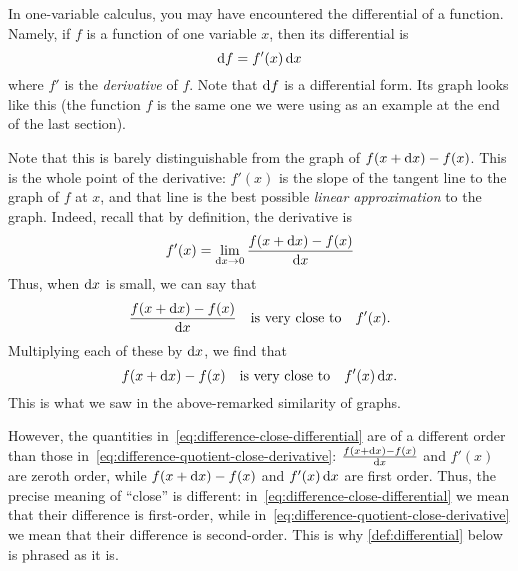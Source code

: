 \documentclass[12pt]{amsart}
\begin{document}
In one-variable calculus, you may have encountered the differential of a function.
Namely, if $f$ is a function of one variable $x$, then its differential is
\begin{equation}
  \mathrm{d} f = f'(x) \, \mathrm{d} x\label{eq:onevariable-differential}
\end{equation}
where $f'$ is the \emph{derivative} of $f$.
Note that $\mathrm{d} f$ is a differential form.
Its graph looks like this (the function $f$ is the same one we were using as an example at the end of the last section).
\begin{center}
\end{center}
Note that this is barely distinguishable from the graph of $f(x+\mathrm{d} x)-f(x)$.
This is the whole point of the derivative: $f'(x)$ is the slope of the tangent line to the graph of $f$ at $x$, and that line is the best possible \emph{linear approximation} to the graph.
Indeed, recall that by definition, the derivative is
\[ f'(x) = \lim_{\mathrm{d} x\to 0} \frac{f(x+\mathrm{d} x)-f(x)}{\mathrm{d} x} \]
Thus, when $\mathrm{d} x$ is small, we can say that
\begin{equation}\label{eq:difference-quotient-close-derivative}
  \frac{f(x+\mathrm{d} x)-f(x)}{\mathrm{d} x}\quad\text{is very close to}\quad f'(x).
\end{equation}
Multiplying each of these by $\mathrm{d} x$, we find that
\begin{equation}
  f(x+\mathrm{d} x)-f(x) \quad\text{is very close to}\quad f'(x)\,\mathrm{d} x.\label{eq:difference-close-differential}
\end{equation}
This is what we saw in the above-remarked similarity of graphs.

\begin{adv}
  However, the quantities in~\cref{eq:difference-close-differential} are of a different order than those in~\cref{eq:difference-quotient-close-derivative}:
  $\frac{f(x+\mathrm{d} x)-f(x)}{\mathrm{d} x}$ and $f'(x)$ are zeroth order, while $f(x+\mathrm{d} x)-f(x)$ and $f'(x)\,\mathrm{d} x$ are first order.
  Thus, the precise meaning of ``close'' is different: in~\cref{eq:difference-close-differential} we mean that their difference is first-order, while in~\cref{eq:difference-quotient-close-derivative} we mean that their difference is second-order.
  This is why \cref{def:differential} below is phrased as it is.
\end{adv}
\end{document}
